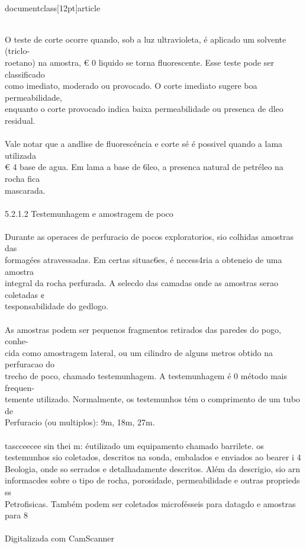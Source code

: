 \\documentclass[12pt]{article}
\begin{document}
\\
O teste de corte ocorre quando, sob a luz ultravioleta, é aplicado um solvente (triclo-\\
roetano) na amostra, € 0 liquido se torna fluorescente. Esse teste pode ser classificado\\
como imediato, moderado ou provocado. O corte imediato sugere boa permeabilidade,\\
enquanto o corte provocado indica baixa permeabilidade ou presenca de dleo residual.\\
\\
Vale notar que a andlise de fluorescéncia e corte sé é possivel quando a lama utilizada\\
€ 4 base de agua. Em lama a base de 6leo, a presenca natural de petréleo na rocha fica\\
mascarada.\\
\\
5.2.1.2 Testemunhagem e amostragem de poco\\
\\
Durante as operaces de perfuracio de pocos exploratorios, sio colhidas amostras das\\
formagées atravessadas. Em certas situac6es, é necess4ria a obten¢io de uma amostra\\
integral da rocha perfurada. A selecdo das camadas onde as amostras serao coletadas ¢\\
tesponsabilidade do gedlogo.\\
\\
As amostras podem ser pequenos fragmentos retirados das paredes do pogo, conhe-\\
cida como amostragem lateral, ou um cilindro de alguns metros obtido na perfuracao do\\
trecho de poco, chamado testemunhagem. A testemunhagem é 0 método mais frequen-\\
temente utilizado. Normalmente, os testemunhos tém o comprimento de um tubo de\\
Perfuracio (ou multiplos): 9m, 18m, 27m.\\
\\
tascceecee sin thei m: éutilizado um equipamento chamado barrilete. os\\
testemunhos sio coletados, descritos na sonda, embalados e enviados ao bearer i 4\\
Beologia, onde so serrados e detalhadamente descritos. Além da descrigio, sio arn\\
informacdes sobre o tipo de rocha, porosidade, permeabilidade e outras proprieds ss\\
Petrofisicas. Também podem ser coletados microfésseis para datagdo e amostras para 8\\
\\
Digitalizada com CamScanner\\
\end{document}
